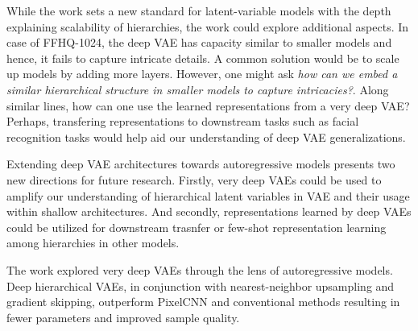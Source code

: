 \documentclass[11pt,letterpaper]{article}
\begin{document}
While the work sets a new standard for latent-variable models with the depth explaining scalability of hierarchies, the work could explore additional aspects. In case of FFHQ-1024, the deep VAE has capacity similar to smaller models and hence, it fails to capture intricate details. A common solution would be to scale up models by adding more layers. However, one might ask \textit{how can we embed a similar hierarchical structure in smaller models to capture intricacies?}. Along similar lines, how can one use the learned representations from a very deep VAE? Perhaps, transfering representations to downstream tasks such as facial recognition tasks would help aid our understanding of deep VAE generalizations. 

Extending deep VAE architectures towards autoregressive models presents two new directions for future research. Firstly, very deep VAEs could be used to amplify our understanding of hierarchical latent variables in VAE and their usage within shallow architectures. And secondly, representations learned by deep VAEs could be utilized for downstream trasnfer or few-shot representation learning among hierarchies in other models. 

The work explored very deep VAEs through the lens of autoregressive models. Deep hierarchical VAEs, in conjunction with nearest-neighbor upsampling and gradient skipping, outperform PixelCNN and conventional methods resulting in fewer parameters and improved sample quality. 
\end{document}
